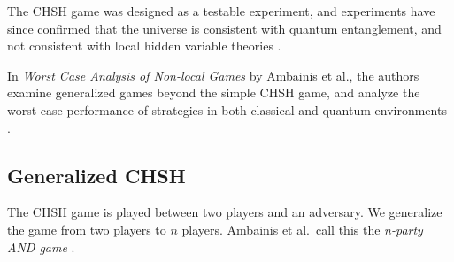 The CHSH game was designed as a testable experiment, and experiments have since confirmed that the universe is consistent with quantum entanglement, and not consistent with local hidden variable theories \cite{aspect}.

In \emph{Worst Case Analysis of Non-local Games} by Ambainis et al., the authors examine generalized games beyond the simple CHSH game, and analyze the worst-case performance of strategies in both classical and quantum environments \cite{ABBSSV}.

\subsection{Generalized CHSH}

The CHSH game is played between two players and an adversary. We generalize the game from two players to $n$ players. Ambainis et al.~call this the \emph{n-party AND game} \cite{ABBSSV}.



